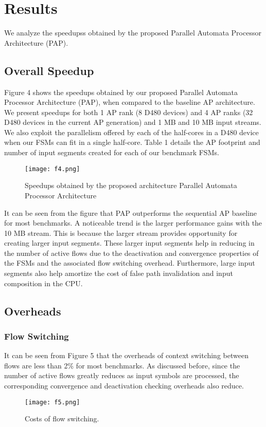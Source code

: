 \section{\textbf{Results}}
We analyze the speedupss obtained by the proposed Parallel Automata Processor Architecture (PAP).
\subsection{Overall Speedup}
Figure 4 \cite{} shows the speedups obtained by our proposed Parallel
Automata Processor Architecture (PAP), when compared to the
baseline AP architecture. We present speedups for both 1 AP rank
(8 D480 devices) and 4 AP ranks (32 D480 devices in the current
AP generation) and 1 MB and 10 MB input streams. We also exploit
the parallelism offered by each of the half-cores in a D480 device
when our FSMs can fit in a single half-core. Table 1 details the
AP footprint and number of input segments created for each of our
benchmark FSMs.
\begin{figure}[t]
    \texttt{[image: f4.png]}
    \centering
    \caption{Speedups obtained by the proposed architecture Parallel Automata Processor Architecture}
\end{figure}

It can be seen from the figure that PAP outperforms the sequential
AP baseline for most benchmarks. A noticeable trend is the larger
performance gains with the 10 MB stream. This is because the larger stream provides opportunity for creating larger input segments.
These larger input segments help in reducing in the number of active
flows due to the deactivation and convergence properties of the
FSMs  and the associated flow
switching overhead. Furthermore, large input segments also help
amortize the cost of false path invalidation and input composition
in the CPU.

\subsection{Overheads}

\subsubsection{Flow Switching}
It can be seen from Figure 5 that the overheads of context switching between flows are
less than 2\% for most benchmarks. As discussed before, since the
number of active flows greatly reduces as input symbols are processed, the corresponding convergence and deactivation checking
overheads also reduce.
\begin{figure}[!]
\texttt{[image: f5.png]}
\centering
\caption{Costs of flow switching.}
\end{figure}

